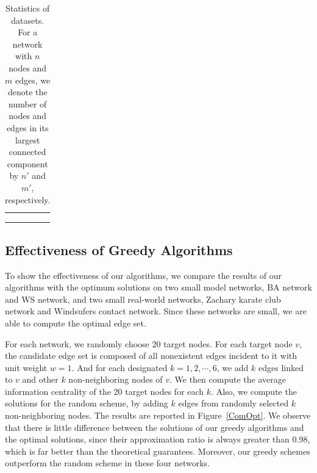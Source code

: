 \documentclass{article}
\begin{document}
\begin{table}
\begin{center}
{\begin{tabular}{ccccc}
%
\raisebox{-0.5ex}{com-DBLP} & \raisebox{-0.5ex}{317,080} & \raisebox{-0.5ex}{1,049,866} & \raisebox{-0.5ex}{317,080} & \raisebox{-0.5ex}{1,049,866} \\[0.5ex]
%
\raisebox{-0.5ex}{roadNet-TX} & \raisebox{-0.5ex}{1,379,917} & \raisebox{-0.5ex}{1,921,660} & \raisebox{-0.5ex}{1,351,137} & \raisebox{-0.5ex}{1,879,201} \\[0.5ex]
\Xhline{2.5\arrayrulewidth}
\end{tabular}
}
\end{center}
\caption{Statistics of datasets. For a network with $n$ nodes and $m$ edges, we denote the number of nodes and edges in its largest connected component by $n'$ and $m'$, respectively. }\label{SetNo}
\end{table}
\subsection{Effectiveness of Greedy Algorithms}

To show the effectiveness of our algorithms,  we compare the results of our algorithms with the optimum solutions on two small model networks, BA network and   WS network, and two  small  real-world networks, Zachary karate club network and Windsufers contact network. Since these networks are small, we are able to compute the optimal edge set.

For each network, we randomly choose 20 target nodes. For each target node $v$,  the candidate edge set is composed of all nonexistent edges incident to it with unit weight $w = 1$.  And for each  designated  $k = 1,2,\cdots,6$, we add  $k$ edges linked to $v$ and other $k$ non-neighboring nodes of $v$. We then compute the average  information centrality of the 20 target nodes for each $k$. Also, we compute the solutions for the random scheme, by adding $k$ edges from randomly selected $k$  non-neighboring nodes.  The results are reported in Figure~\ref{ComOpt}. We observe that there is little difference between the solutions of our greedy algorithms and the optimal solutions, since their approximation ratio  is always greater than 0.98, which is far better than the theoretical guarantees. Moreover, our greedy schemes outperform the random scheme in these four networks.

%
\end{document}
